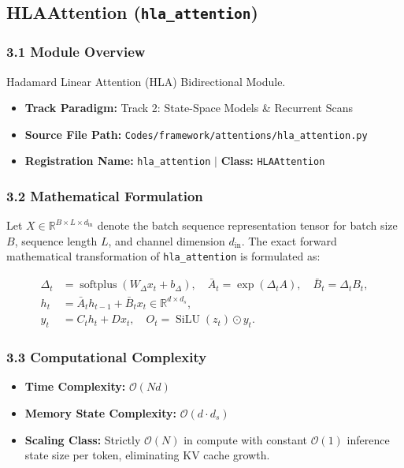 \subsection{HLAAttention (\texttt{hla\_attention})}
\label{sec:app_module_hla_attention}

\subsubsection*{3.1 Module Overview}
Hadamard Linear Attention (HLA) Bidirectional Module.
\begin{itemize}
    \item \textbf{Track Paradigm:} Track 2: State-Space Models \& Recurrent Scans
    \item \textbf{Source File Path:} \texttt{Codes/framework/attentions/hla\_attention.py}
    \item \textbf{Registration Name:} \texttt{hla\_attention} $\mid$ \textbf{Class:} \texttt{HLAAttention}
\end{itemize}

\subsubsection*{3.2 Mathematical Formulation}
Let $X \in \mathbb{R}^{B \times L \times d_{\text{in}}}$ denote the batch sequence representation tensor for batch size $B$, sequence length $L$, and channel dimension $d_{\text{in}}$. The exact forward mathematical transformation of \texttt{hla\_attention} is formulated as:

\begin{align}
\Delta_t &= \operatorname{softplus}(W_\Delta x_t + b_\Delta), \quad \bar{A}_t = \exp(\Delta_t A), \quad \bar{B}_t = \Delta_t B_t, \\
h_t &= \bar{A}_t h_{t-1} + \bar{B}_t x_t \in \mathbb{R}^{d \times d_s}, \\
y_t &= C_t h_t + D x_t, \quad O_t = \operatorname{SiLU}(z_t) \odot y_t.
\end{align}


\subsubsection*{3.3 Computational Complexity}
\begin{itemize}
    \item \textbf{Time Complexity:} $\mathcal{O}(N d)$
    \item \textbf{Memory State Complexity:} $\mathcal{O}(d \cdot d_s)$
    \item \textbf{Scaling Class:} Strictly $\mathcal{O}(N)$ in compute with constant $\mathcal{O}(1)$ inference state size per token, eliminating KV cache growth.
\end{itemize}

